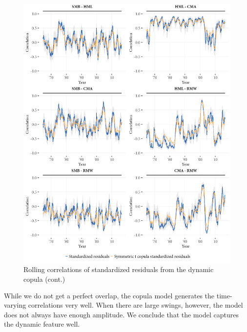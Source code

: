 \begin{figure}[!ht]
  \ContinuedFloat
  \centering
  \includegraphics[width=\textwidth]{graphics/rolling_simulated2.png}
  \footnotesize
  \caption{Rolling correlations of standardized residuals from the dynamic copula (cont.)}
\end{figure}

While we do not get a perfect overlap, the copula model generates the time-varying correlations very well. When there are large swings, however, the model does not always have enough amplitude. We conclude that the model captures the dynamic feature well.